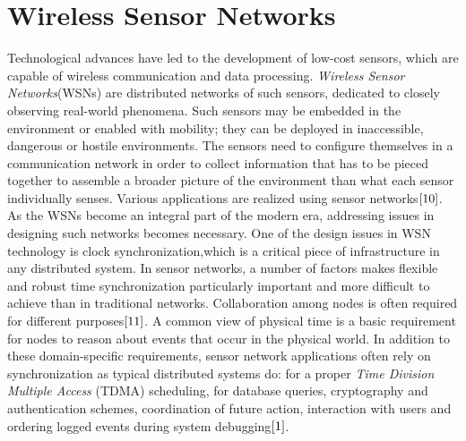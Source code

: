 \documentclass[a4paper,10pt]{report}
\begin{document}
\section{\textbf{Wireless Sensor Networks}}
\noindent Technological advances have led to the development of
low-cost sensors, which are capable of wireless communication and
data processing. \textit{Wireless Sensor Networks}(WSNs) are
distributed networks of such sensors, dedicated to closely observing
real-world phenomena. Such sensors may be embedded in the
environment  or enabled with mobility; they can be deployed in
inaccessible, dangerous or hostile environments. The sensors need to
configure themselves in a communication network in order to collect
information that has to be pieced together to assemble a broader
picture of the environment than what each sensor individually
senses. Various applications are realized using sensor
networks$\cite{10}$. As the WSNs become an integral part of the
modern era, addressing issues in designing such networks becomes
necessary.
\newline One of the design issues in WSN technology is clock
synchronization,which is a critical piece of infrastructure in any
distributed system. In sensor networks, a number of factors makes
flexible and robust time synchronization particularly important and
more difficult to achieve than in traditional networks.
\newline
Collaboration among nodes is often required for different
purposes$\cite{11}$. A common view of physical time is a basic
requirement for nodes to reason about events that occur in the
physical world. In addition to these domain-specific requirements,
sensor network applications often rely on synchronization as typical
distributed systems do: for a proper \textit{Time Division Multiple Access}
(TDMA) scheduling, for database queries, cryptography and authentication
schemes, coordination of
future action, interaction with users and ordering logged events
during system debugging$\cite{1}$.
\end{document}

